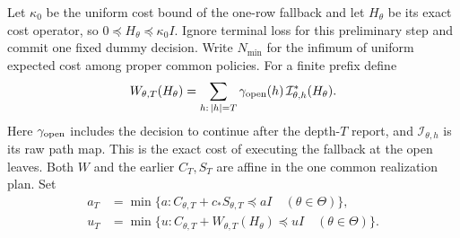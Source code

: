 Let $\kappa_0$ be the uniform cost bound of the one-row fallback and let $H_\theta$ be its exact cost operator, so $0\preccurlyeq H_\theta\preccurlyeq \kappa_0I$. Ignore terminal loss for this preliminary step and commit one fixed dummy decision. Write $N_{\min}$ for the infimum of uniform expected cost among proper common policies. For a finite prefix define
\[
 W_{\theta,T}(H_\theta)
   =\sum_{h:\,|h|=T}\gamma_{\rm open}(h)\,
                       \mathcal I_{\theta,h}^*(H_\theta).
\]
Here $\gamma_{\rm open}$ includes the decision to continue after the depth-$T$ report, and $\mathcal I_{\theta,h}$ is its raw path map. This is the exact cost of executing the fallback at the open leaves. Both $W$ and the earlier $C_T,S_T$ are affine in the one common realization plan. Set
\begin{align*}
 a_T&=\min\{a:C_{\theta,T}+c_*S_{\theta,T}\preccurlyeq aI\quad(\theta\in\Theta)\},\\
 u_T&=\min\{u:C_{\theta,T}+W_{\theta,T}(H_\theta)\preccurlyeq uI\quad(\theta\in\Theta)\}.
\end{align*}

